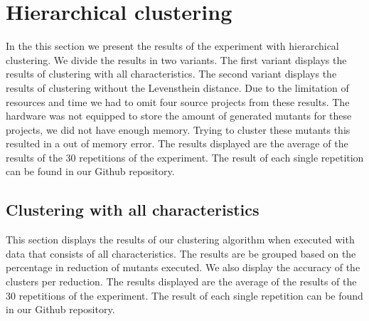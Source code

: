 \documentclass[../../main]{subfiles}
\begin{document}
\section{Hierarchical clustering}
\label{ch:results_rq1}
In the this section we present the results of the experiment with hierarchical clustering.
We divide the results in two variants. 
The first variant displays the results of clustering with all characteristics.
The second variant displays the results of clustering without the Levensthein distance.
\newline
Due to the limitation of resources and time we had to omit four source projects from these results. 
The hardware was not equipped to store the amount of generated mutants for these projects, we did not have enough memory.
Trying to cluster these mutants this resulted in a out of memory error.
\newline
The results displayed are the average of the results of the 30 repetitions of the experiment.
The result of each single repetition can be found in our Github repository\cite{rbasarat-repo}.

\subsection{Clustering with all characteristics}
This section displays the results of our clustering algorithm when executed with data that consists of all characteristics.
The results are be grouped based on the percentage in reduction of mutants executed.
We also display the accuracy of the clusters per reduction.
The results displayed are the average of the results of the 30 repetitions of the experiment.
The result of each single repetition can be found in our Github repository\cite{rbasarat-repo}.
\end{document}
